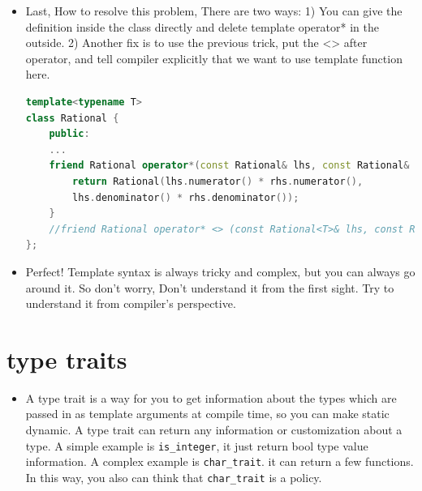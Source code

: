 \documentclass[a4paper,11pt,twoside]{book}
\begin{document}
\begin{itemize}
	\item Last, How to resolve this problem, There are two ways: 1) You can give the definition inside the class directly and delete template operator* in the outside. 2) Another fix is to use the previous trick, put the <> after operator, and tell compiler explicitly that we want to use template function here.   
\begin{lstlisting}[frame=single, language=c++]
template<typename T>
class Rational {
	public:
	...
	friend Rational operator*(const Rational& lhs, const Rational& rhs){ 
		return Rational(lhs.numerator() * rhs.numerator(), 
		lhs.denominator() * rhs.denominator());  
	} 	
	//friend Rational operator* <> (const Rational<T>& lhs, const Rational<T>& rhs); 
};		
\end{lstlisting}	
	
	\item Perfect! Template syntax is always tricky and complex, but you can always go around it. So don't worry, Don't understand it from the first sight. Try to understand it from compiler's perspective. 
	
\end{itemize}



\section{type traits}

\begin{itemize}
	\item A type trait is a way for you to get information about the types which are passed in as template arguments at compile time, so you can make static dynamic. A type trait can return any information or customization about a type. A simple example is \texttt{is\_integer}, it just return bool type value information. A complex example is \texttt{char\_trait}. it can return a few functions. In this way, you also can think that \texttt{char\_trait} is a policy. 
	
\end{itemize}
\end{document}
